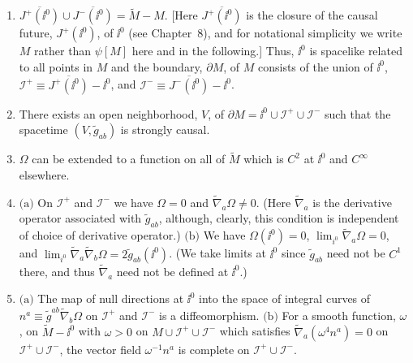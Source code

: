 \begin{enumerate}[label=\textup{(\arabic*)},leftmargin=2.2em]
\item
\(\overline{J^+(\ii^0)}\cup\overline{J^-(\ii^0)}=\tilde M-M\). [Here
\(\overline{J^+(\ii^0)}\) is the closure of the causal future, \(J^+(\ii^0)\), of
\(\ii^0\) (see Chapter~8), and for notational simplicity we write \(M\) rather than
\(\psi[M]\) here and in the following.] Thus, \(\ii^0\) is spacelike related to all
points in \(M\) and the boundary, \(\partial M\), of \(M\) consists of the union of
\(\ii^0\), \(\mathcal I^+\equiv\overline{J^+(\ii^0)}-\ii^0\), and
\(\mathcal I^-\equiv\overline{J^-(\ii^0)}-\ii^0\).

\item
There exists an open neighborhood, \(V\), of
\(\partial M=\ii^0\cup\mathcal I^+\cup\mathcal I^-\) such that the spacetime
\((V,\tilde g_{ab})\) is strongly causal.

\item
\(\Omega\) can be extended to a function on all of \(\tilde M\) which is \(C^2\) at
\(\ii^0\) and \(C^\infty\) elsewhere.

\item
\(\text{(a)}\) On \(\mathcal I^+\) and \(\mathcal I^-\) we have \(\Omega=0\) and
\(\tilde\nabla_a\Omega\ne0\). (Here \(\tilde\nabla_a\) is the derivative operator
associated with \(\tilde g_{ab}\), although, clearly, this condition is independent
of choice of derivative operator.) \(\text{(b)}\) We have \(\Omega(\ii^0)=0\),
\(\lim_{i^0}\tilde\nabla_a\Omega=0\), and
\(\lim_{i^0}\tilde\nabla_a\tilde\nabla_b\Omega=2\tilde g_{ab}(\ii^0)\). (We take
limits at \(\ii^0\) since \(\tilde g_{ab}\) need not be \(C^1\) there, and thus
\(\tilde\nabla_a\) need not be defined at \(\ii^0\).)

\item
\(\text{(a)}\) The map of null directions at \(\ii^0\) into the space of integral curves
of \(n^a\equiv\tilde g^{ab}\tilde\nabla_b\Omega\) on \(\mathcal I^+\) and
\(\mathcal I^-\) is a diffeomorphism. \(\text{(b)}\) For a smooth function,
\(\omega\), on \(\tilde M-\ii^0\) with \(\omega>0\) on
\(M\cup\mathcal I^+\cup\mathcal I^-\) which satisfies
\(\tilde\nabla_a(\omega^4n^a)=0\) on \(\mathcal I^+\cup\mathcal I^-\), the vector
field \(\omega^{-1}n^a\) is complete on \(\mathcal I^+\cup\mathcal I^-\).
\end{enumerate}

